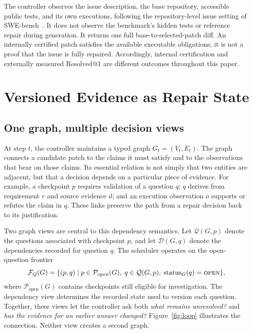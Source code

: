 \documentclass[acmsmall,screen,review,anonymous]{acmart}
\newcommand{\open}{\textsc{open}}
\newcommand{\status}{\operatorname{status}}
\begin{document}
The controller observes the issue description, the base repository, accessible public tests, and its own executions, following the repository-level issue setting of SWE-bench~\cite{jimenez2024swebench}. It does not observe the benchmark's hidden tests or reference repair during generation. It returns one full base-to-selected-patch diff. An internally certified patch satisfies the available executable obligations; it is not a proof that the issue is fully repaired. Accordingly, internal certification and externally measured Resolved@1 are different outcomes throughout this paper.

\section{Versioned Evidence as Repair State}
\subsection{One graph, multiple decision views}
At step $t$, the controller maintains a typed graph $G_t=(V_t,E_t)$. The graph connects a candidate patch to the claims it must satisfy and to the observations that bear on those claims. Its essential relation is not simply that two entities are adjacent, but that a decision depends on a particular piece of evidence. For example, a checkpoint $p$ requires validation of a question $q$; $q$ derives from requirement $r$ and source evidence $d$; and an execution observation $o$ supports or refutes the claim in $q$. These links preserve the path from a repair decision back to its justification.

Two graph views are central to this dependency semantics. Let $\mathcal{Q}(G,p)$ denote the questions associated with checkpoint $p$, and let $\mathcal{D}(G,q)$ denote the dependencies recorded for question $q$. The scheduler operates on the open-question frontier
\begin{equation}
 \mathcal{F}_Q(G)=\{(p,q)\mid p\in\mathcal{P}_{\mathrm{open}}(G),\;
 q\in\mathcal{Q}(G,p),\;\status_G(q)=\open\},
 \label{eq:question-frontier}
\end{equation}
where $\mathcal{P}_{\mathrm{open}}(G)$ contains checkpoints still eligible for investigation. The dependency view determines the recorded state used to version each question. Together, these views let the controller ask both \emph{what remains unresolved?} and \emph{has the evidence for an earlier answer changed?} Figure~\ref{fig:loop} illustrates the connection. Neither view creates a second graph.
\end{document}
